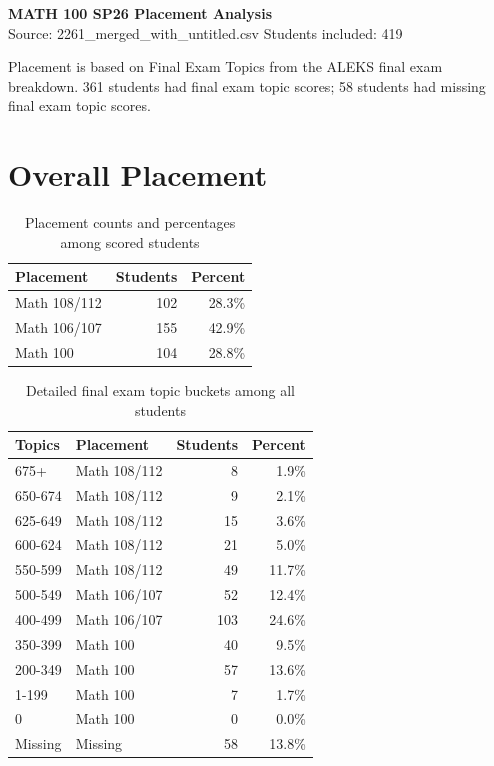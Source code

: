 \documentclass[11pt]{article}
\begin{document}
\begin{center}
{\Large\bfseries MATH 100 SP26 Placement Analysis}\\[4pt]
{\normalsize Source: 2261\_merged\_with\_untitled.csv \quad Students included: 419}
\end{center}

Placement is based on Final Exam Topics from the ALEKS final exam breakdown. 361 students had final exam topic scores; 58 students had missing final exam topic scores.

\section*{Overall Placement}

\begin{table}[htbp]
\centering
\small
\caption{Placement counts and percentages among scored students}
\begin{tabular}{lrr}
\hline
Placement & Students & Percent \\
\hline
Math 108/112 & 102 & 28.3\% \\
Math 106/107 & 155 & 42.9\% \\
Math 100 & 104 & 28.8\% \\
\hline
\end{tabular}
\end{table}

\begin{table}[htbp]
\centering
\small
\caption{Detailed final exam topic buckets among all students}
\begin{tabular}{llrr}
\hline
Topics & Placement & Students & Percent \\
\hline
675+ & Math 108/112 & 8 & 1.9\% \\
650-674 & Math 108/112 & 9 & 2.1\% \\
625-649 & Math 108/112 & 15 & 3.6\% \\
600-624 & Math 108/112 & 21 & 5.0\% \\
550-599 & Math 108/112 & 49 & 11.7\% \\
500-549 & Math 106/107 & 52 & 12.4\% \\
400-499 & Math 106/107 & 103 & 24.6\% \\
350-399 & Math 100 & 40 & 9.5\% \\
200-349 & Math 100 & 57 & 13.6\% \\
1-199 & Math 100 & 7 & 1.7\% \\
0 & Math 100 & 0 & 0.0\% \\
Missing & Missing & 58 & 13.8\% \\
\hline
\end{tabular}
\end{table}
\end{document}
